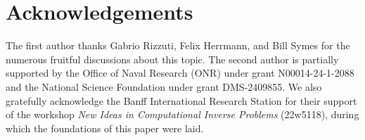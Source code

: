 \documentclass[12pt]{amsart}
\begin{document}
\section*{Acknowledgements}
The first author thanks Gabrio Rizzuti, Felix Herrmann, and Bill Symes for the numerous fruitful discussions about this topic. The second author is partially supported by the Office of Naval Research (ONR) under grant N00014-24-1-2088 and the National Science Foundation under grant DMS-2409855.  We also gratefully acknowledge the Banff International Research Station for their support of the workshop \emph{New Ideas in Computational Inverse Problems} (22w5118), during which the foundations of this paper were laid. 
\clearpage






\appendix
\end{document}
